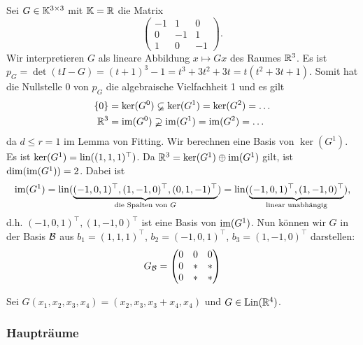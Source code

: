 \begin{bsp}
	Sei $ G \in \mathbb K^{3 \times 3} $ mit $ \mathbb K = \mathbb R $ die Matrix
	\begin{equation*}
		\begin{pmatrix}
			-1 & 1 & 0 \\
			0 & -1 & 1 \\
			1 & 0 & -1
		\end{pmatrix}.
	\end{equation*}
	Wir interpretieren $ G $ als lineare Abbildung $ x \mapsto Gx $ des Raumes $ \mathbb R^3 $. Es ist $ p_G = \det(tI - G) = (t+1)^3 - 1 = t^3 + 3t^2 + 3t = t(t^2 + 3t + 1) $. Somit hat die Nullstelle 0 von $ p_G $ die algebraische Vielfachheit 1 und es gilt
	\begin{align*}
		\left\{ 0 \right\} &= \ker(G^0) \varsubsetneq \ker(G^1) = \ker(G^2) = \ldots \\
		\mathbb R^3 &= \operatorname{im}(G^0) \varsupsetneq \operatorname{im}(G^1) = \operatorname{im}(G^2) = \ldots
	\end{align*}
	da $ d \leq r = 1 $ im Lemma von Fitting. Wir berechnen eine Basis von $ \ker(G^1) $. Es ist $ \ker(G^1) = \operatorname{lin}((1,1,1)^\top) $. Da $ \mathbb R^3 = \ker(G^1) \oplus \operatorname{im}(G^1) $ gilt, ist $ \dim(\operatorname{im}(G^1)) = 2 $. Dabei ist
	\begin{equation*}
		\operatorname{im}(G^1) = \operatorname{lin}(\underbrace{(-1,0,1)^\top, (1,-1,0)^\top, (0,1,-1)^\top}_{\text{die Spalten von $ G $}})
		= \operatorname{lin}(\underbrace{(-1,0,1)^\top, (1,-1,0)^\top}_{\text{linear unabhängig}}),
	\end{equation*}
	d.h. $ (-1,0,1)^\top, (1,-1,0)^\top $ ist eine Basis von $ \operatorname{im}(G^1) $. Nun können wir $ G $ in der Basis $ \mathcal{B} $ aus $ b_1 = (1,1,1)^\top $, $ b_2 = (-1,0,1)^\top $, $ b_3 = (1,-1,0)^\top $ darstellen:
	\begin{equation*}
		G_{\mathcal{B}} = \begin{pmatrix}
			0 & 0 & 0 \\
			0 & \ast & \ast \\
			0 & \ast & \ast
		\end{pmatrix}
	\end{equation*}
\end{bsp}
\begin{bsp}
	Sei $ G(x_1,x_2,x_3,x_4) = (x_2,x_3,x_3+x_4,x_4) $ und $ G \in \operatorname{Lin}(\mathbb R^4) $.
\end{bsp}

\subsubsection{Haupträume}
\label{sec:6_4_5}

